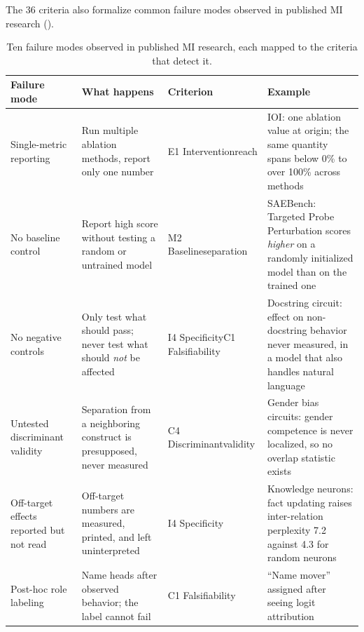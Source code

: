 \documentclass{article}
\begin{document}
The 36 criteria also formalize common failure modes observed in published MI research ().

\begingroup
\small
\begin{table}[H]
\centering
\caption{Ten failure modes observed in published MI research, each mapped to the criteria that detect it.}
\label{tab:failures}
\renewcommand{\arraystretch}{1.15}
\begin{tabular}{@{}l>{\raggedright\arraybackslash}p{3.2cm}>{\raggedright\arraybackslash}p{2.8cm}>{\raggedright\arraybackslash}p{4.0cm}@{}}
\toprule
\textbf{Failure mode} & \textbf{What happens} & \textbf{Criterion} & \textbf{Example} \\
\midrule
Single-metric reporting & Run multiple ablation methods, report only one number & E1 Intervention\newline reach & IOI: one ablation value at origin; the same quantity spans below 0\% to over 100\% across methods \citep{miller2024transformer} \\
\midrule
No baseline control & Report high score without testing a random or untrained model & M2 Baseline\newline separation & SAEBench: Targeted Probe Perturbation scores \emph{higher} on a randomly initialized model than on the trained one \citep{karvonen2025saebench} \\
\midrule
No negative controls & Only test what should pass; never test what should \emph{not} be affected & I4 Specificity\newline C1 Falsifiability & Docstring circuit: effect on non-docstring behavior never measured, in a model that also handles natural language \\
\midrule
Untested discriminant validity & Separation from a neighboring construct is presupposed, never measured & C4 Discriminant\newline validity & Gender bias circuits: gender competence is never localized, so no overlap statistic exists \\
\midrule
Off-target effects reported but not read & Off-target numbers are measured, printed, and left uninterpreted & I4 Specificity & Knowledge neurons: fact updating raises inter-relation perplexity 7.2 against 4.3 for random neurons \citep{dai2022knowledge} \\
\midrule
Post-hoc role labeling & Name heads after observed behavior; the label cannot fail & C1 Falsifiability & ``Name mover'' assigned after seeing logit attribution \\
\midrule

\end{tabular}
\end{table}
\end{document}
